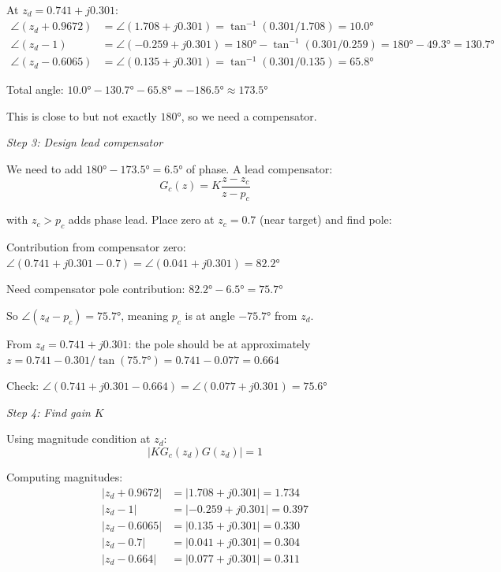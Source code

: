 \begin{example}
At $z_d = 0.741 + j0.301$:
\begin{align}
\angle(z_d + 0.9672) &= \angle(1.708 + j0.301) = \tan^{-1}(0.301/1.708) = 10.0° \\
\angle(z_d - 1) &= \angle(-0.259 + j0.301) = 180° - \tan^{-1}(0.301/0.259) = 180° - 49.3° = 130.7° \\
\angle(z_d - 0.6065) &= \angle(0.135 + j0.301) = \tan^{-1}(0.301/0.135) = 65.8°
\end{align}

Total angle: $10.0° - 130.7° - 65.8° = -186.5° \approx 173.5°$

This is close to but not exactly $180°$, so we need a compensator.

\textit{Step 3: Design lead compensator}

We need to add $180° - 173.5° = 6.5°$ of phase. A lead compensator:
\begin{equation}
G_c(z) = K \frac{z - z_c}{z - p_c}
\end{equation}

with $z_c > p_c$ adds phase lead. Place zero at $z_c = 0.7$ (near target) and find pole:

Contribution from compensator zero: $\angle(0.741 + j0.301 - 0.7) = \angle(0.041 + j0.301) = 82.2°$

Need compensator pole contribution: $82.2° - 6.5° = 75.7°$

So $\angle(z_d - p_c) = 75.7°$, meaning $p_c$ is at angle $-75.7°$ from $z_d$.

From $z_d = 0.741 + j0.301$: the pole should be at approximately $z = 0.741 - 0.301/\tan(75.7°) = 0.741 - 0.077 = 0.664$

Check: $\angle(0.741 + j0.301 - 0.664) = \angle(0.077 + j0.301) = 75.6°$ \checkmark

\textit{Step 4: Find gain $K$}

Using magnitude condition at $z_d$:
\begin{equation}
|KG_c(z_d)G(z_d)| = 1
\end{equation}

Computing magnitudes:
\begin{align}
|z_d + 0.9672| &= |1.708 + j0.301| = 1.734 \\
|z_d - 1| &= |-0.259 + j0.301| = 0.397 \\
|z_d - 0.6065| &= |0.135 + j0.301| = 0.330 \\
|z_d - 0.7| &= |0.041 + j0.301| = 0.304 \\
|z_d - 0.664| &= |0.077 + j0.301| = 0.311
\end{align}


\end{example}
